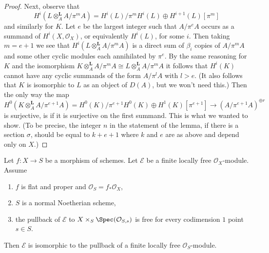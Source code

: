 \begin{proof}
Next, observe that
$$
H^i(L \otimes_A^\mathbf{L} A/\pi^m A) =
H^i(L)/\pi^m H^i(L) \oplus H^{i + 1}(L)[\pi^m]
$$
and similarly for $K$. Let $e$ be the largest integer
such that $A/\pi^eA$ occurs as a summand of $H^i(X, \mathcal{O}_X)$,
or equivalently $H^i(L)$, for some $i$. Then taking $m = e + 1$
we see that $H^i(L \otimes_A^\mathbf{L} A/\pi^m A)$ is a direct sum of
$\beta_i$ copies of $A/\pi^m A$ and some other cyclic modules
each annihilated by $\pi^e$. By the same reasoning for $K$
and the isomorphism
$K \otimes_A^\mathbf{L} A/\pi^m A \cong L \otimes_A^\mathbf{L} A/\pi^m A$
it follows that $H^i(K)$
cannot have any cyclic summands of the form $A/\pi^l A$
with $l > e$. (It also follows that $K$ is isomorphic to $L$
as an object of $D(A)$, but we won't need this.)
Then the only way the map
$$
H^0(K \otimes^\mathbf{L}_A A/\pi^{e + 1} A) =
H^0(K)/\pi^{e + 1}H^0(K) \oplus H^1(K)[\pi^{e + 1}]
\longrightarrow
(A/\pi^{e + 1} A)^{\oplus r}
$$
is surjective, is if it is surjective on the
first summand. This is what we wanted to show.
(To be precise, the integer $n$ in the statement of
the lemma, if there is a section $\sigma$,
should be equal to $k + e + 1$ where $k$ and $e$ are as above
and depend only on $X$.)
\end{proof}

\begin{lemma}
\label{lemma-trivial-over-dvrs}
Let $f : X \to S$ be a morphism of schemes.
Let $\mathcal{E}$ be a finite locally free $\mathcal{O}_X$-module.
Assume
\begin{enumerate}
\item $f$ is flat and proper and $\mathcal{O}_S = f_*\mathcal{O}_X$,
\item $S$ is a normal Noetherian scheme,
\item the pullback of $\mathcal{E}$ to $X \times_S \Spec(\mathcal{O}_{S, s})$
is free for every codimension $1$ point $s \in S$.
\end{enumerate}
Then $\mathcal{E}$ is isomorphic to the pullback of a finite
locally free $\mathcal{O}_S$-module.
\end{lemma}

